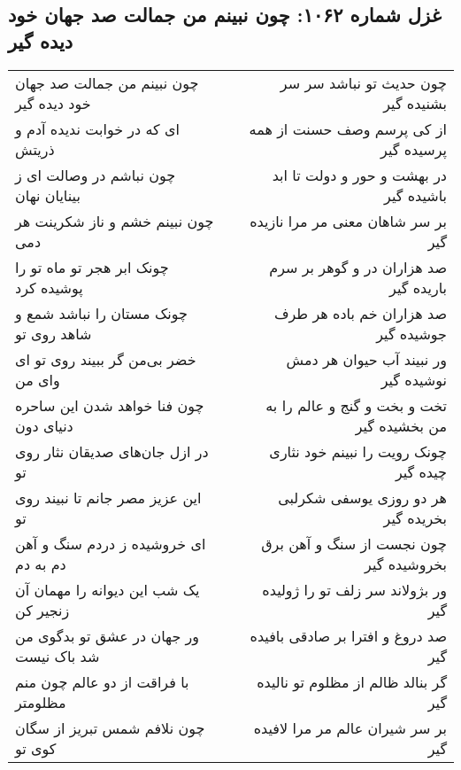 \begin{center}
\section*{غزل شماره ۱۰۶۲: چون نبینم من جمالت صد جهان خود دیده گیر}
\label{sec:1062}
\begin{longtable}{l p{0.5cm} r}
چون نبینم من جمالت صد جهان خود دیده گیر
&&
چون حدیث تو نباشد سر سر بشنیده گیر
\\
ای که در خوابت ندیده آدم و ذریتش
&&
از کی پرسم وصف حسنت از همه پرسیده گیر
\\
چون نباشم در وصالت ای ز بینایان نهان
&&
در بهشت و حور و دولت تا ابد باشیده گیر
\\
چون نبینم خشم و ناز شکرینت هر دمی
&&
بر سر شاهان معنی مر مرا نازیده گیر
\\
چونک ابر هجر تو ماه تو را پوشیده کرد
&&
صد هزاران در و گوهر بر سرم باریده گیر
\\
چونک مستان را نباشد شمع و شاهد روی تو
&&
صد هزاران خم باده هر طرف جوشیده گیر
\\
خضر بی‌من گر ببیند روی تو ای وای من
&&
ور نبیند آب حیوان هر دمش نوشیده گیر
\\
چون فنا خواهد شدن این ساحره دنیای دون
&&
تخت و بخت و گنج و عالم را به من بخشیده گیر
\\
در ازل جان‌های صدیقان نثار روی تو
&&
چونک رویت را نبینم خود نثاری چیده گیر
\\
این عزیز مصر جانم تا نبیند روی تو
&&
هر دو روزی یوسفی شکرلبی بخریده گیر
\\
ای خروشیده ز دردم سنگ و آهن دم به دم
&&
چون نجست از سنگ و آهن برق بخروشیده گیر
\\
یک شب این دیوانه را مهمان آن زنجیر کن
&&
ور بژولاند سر زلف تو را ژولیده گیر
\\
ور جهان در عشق تو بدگوی من شد باک نیست
&&
صد دروغ و افترا بر صادقی بافیده گیر
\\
با فراقت از دو عالم چون منم مظلومتر
&&
گر بنالد ظالم از مظلوم تو نالیده گیر
\\
چون نلافم شمس تبریز از سگان کوی تو
&&
بر سر شیران عالم مر مرا لافیده گیر
\\
\end{longtable}
\end{center}
